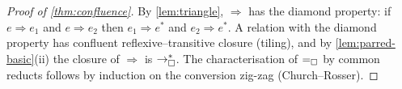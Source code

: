 \begin{proof}[Proof of \cref{thm:confluence}]
By \cref{lem:triangle}, $\Rightarrow$ has the diamond property: if $e
\Rightarrow e_1$ and $e \Rightarrow e_2$ then $e_1 \Rightarrow e^{\ast}$
and $e_2 \Rightarrow e^{\ast}$.  A relation with the diamond property
has confluent reflexive--transitive closure (tiling), and by
\cref{lem:parred-basic}(ii) the closure of $\Rightarrow$ is $\rightarrow_{\square}^{*}$.
The characterisation of $=_{\square}$ by common reducts follows by induction
on the conversion zig-zag (Church--Rosser).
\end{proof}
